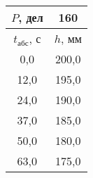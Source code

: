 \begin{tabular}[t]{|c|c|}
\hline
$P$, дел & 160 \\
\hline
$t_{абс}$, с & $h$, мм \\ 
\hline
0,0 & 200,0 \\ 
12,0 & 195,0 \\ 
24,0 & 190,0 \\ 
37,0 & 185,0 \\ 
50,0 & 180,0 \\ 
63,0 & 175,0 \\ 
\hline
\end{tabular}